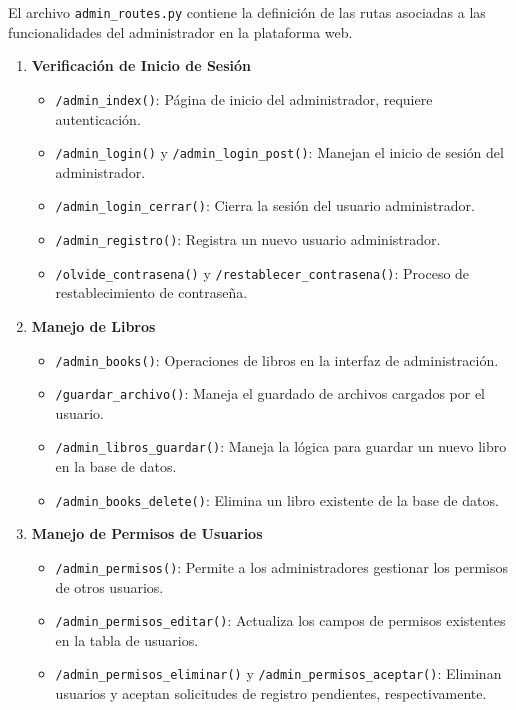 \documentclass[a4paper, 12pt]{book}
\begin{document}
El archivo \texttt{admin\_routes.py} contiene la definición de las rutas asociadas a las funcionalidades del administrador en la plataforma web.

\begin{enumerate}
    \item \textbf{Verificación de Inicio de Sesión}
    \begin{itemize}
        \item \texttt{/admin\_index()}: Página de inicio del administrador, requiere autenticación.
        \item \texttt{/admin\_login()} y \texttt{/admin\_login\_post()}: Manejan el inicio de sesión del administrador.
        \item \texttt{/admin\_login\_cerrar()}: Cierra la sesión del usuario administrador.
        \item \texttt{/admin\_registro()}: Registra un nuevo usuario administrador.
        \item \texttt{/olvide\_contrasena()} y \texttt{/restablecer\_contrasena()}: Proceso de restablecimiento de contraseña.
    \end{itemize}

    \item \textbf{Manejo de Libros}
    \begin{itemize}
        \item \texttt{/admin\_books()}: Operaciones de libros en la interfaz de administración.
        \item \texttt{/guardar\_archivo()}: Maneja el guardado de archivos cargados por el usuario.
        \item \texttt{/admin\_libros\_guardar()}: Maneja la lógica para guardar un nuevo libro en la base de datos.
        \item \texttt{/admin\_books\_delete()}: Elimina un libro existente de la base de datos.
    \end{itemize}

    \item \textbf{Manejo de Permisos de Usuarios}
    \begin{itemize}
        \item \texttt{/admin\_permisos()}: Permite a los administradores gestionar los permisos de otros usuarios.
        \item \texttt{/admin\_permisos\_editar()}: Actualiza los campos de permisos existentes en la tabla de usuarios.
        \item \texttt{/admin\_permisos\_eliminar()} y \texttt{/admin\_permisos\_aceptar()}: Eliminan usuarios y aceptan solicitudes de registro pendientes, respectivamente.
    \end{itemize}


\end{enumerate}
\end{document}

